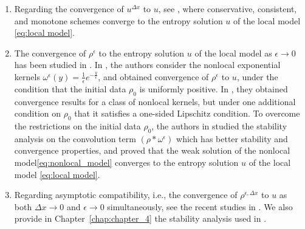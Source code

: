 \begin{enumerate}
    \item Regarding the convergence of $u^{\Delta x}$ to $u$, see \cite[Chapter~4]{Ulrik2015}, where conservative, consistent, and monotone schemes converge to the entropy solution $u$ of the local model \eqref{eq:local model}.
    \item The convergence of $\rho^{\epsilon}$ to the entropy solution $u$ of the local model as $\epsilon \rightarrow 0$ has been studied in \cite{bressanEntropyAdmissibilityLimit2021,colomboLocalLimitNonlocal2021,cocliteGeneralResultApproximation2022}. In \cite{bressanEntropyAdmissibilityLimit2021}, the authors consider the nonlocal exponential kernels $\omega^{\epsilon}(y)=\frac{1}{\epsilon}e^{-\frac{y}{\epsilon}}$, and obtained convergence of $\rho^{\epsilon}$ to $u$, under the condition that the initial data $\rho_0$ is uniformly positive. In \cite{colomboLocalLimitNonlocal2021}, they obtained convergence results for a class of nonlocal kernels, but under one additional condition on $\rho_0$ that it satisfies a one-sided Lipschitz condition. To overcome the restrictions on the initial data $\rho_0$, the authors in \cite{cocliteGeneralResultApproximation2022} studied the stability analysis on the convolution term $(\rho*\omega^{\epsilon})$ which has better stability and convergence properties, and proved that the weak solution of the nonlocal model\eqref{eq:nonlocal_model} converges to the entropy solution $u$ of the local model \eqref{eq:local model}.
    \item Regarding asymptotic compatibility, i.e., the convergence of $\rho^{\epsilon, \Delta x}$ to $u$ as both $\Delta x \rightarrow 0$ and $\epsilon \rightarrow 0$ simultaneously, see the recent studies in \cite{huangAsymptoticCompatibilityClass2024,nittiAsymptoticallyCompatibleEntropyconsistent2025}. We also provide in Chapter~\ref{chap:chapter_4} the stability analysis used in \cite{huangAsymptoticCompatibilityClass2024}.
\end{enumerate}





